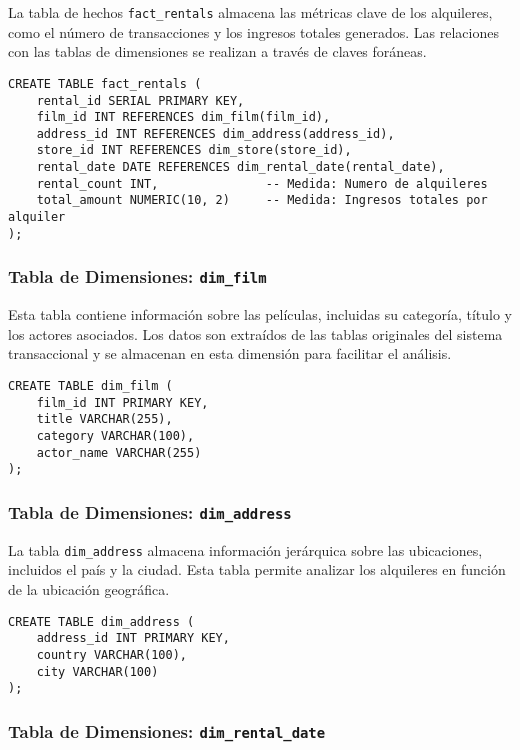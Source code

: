 \documentclass{article}
\begin{document}
La tabla de hechos \texttt{fact\_rentals} almacena las métricas clave de los alquileres, como el número de transacciones y los ingresos totales generados. Las relaciones con las tablas de dimensiones se realizan a través de claves foráneas.

\begin{lstlisting}
CREATE TABLE fact_rentals (
    rental_id SERIAL PRIMARY KEY,
    film_id INT REFERENCES dim_film(film_id),
    address_id INT REFERENCES dim_address(address_id),
    store_id INT REFERENCES dim_store(store_id),
    rental_date DATE REFERENCES dim_rental_date(rental_date),
    rental_count INT,               -- Medida: Numero de alquileres
    total_amount NUMERIC(10, 2)     -- Medida: Ingresos totales por alquiler
);
\end{lstlisting}

\subsubsection{Tabla de Dimensiones: \texttt{dim\_film}}

Esta tabla contiene información sobre las películas, incluidas su categoría, título y los actores asociados. Los datos son extraídos de las tablas originales del sistema transaccional y se almacenan en esta dimensión para facilitar el análisis.

\begin{lstlisting}
CREATE TABLE dim_film (
    film_id INT PRIMARY KEY,
    title VARCHAR(255),
    category VARCHAR(100),
    actor_name VARCHAR(255)
);
\end{lstlisting}

\subsubsection{Tabla de Dimensiones: \texttt{dim\_address}}

La tabla \texttt{dim\_address} almacena información jerárquica sobre las ubicaciones, incluidos el país y la ciudad. Esta tabla permite analizar los alquileres en función de la ubicación geográfica.

\begin{lstlisting}
CREATE TABLE dim_address (
    address_id INT PRIMARY KEY,
    country VARCHAR(100),
    city VARCHAR(100)
);
\end{lstlisting}

\subsubsection{Tabla de Dimensiones: \texttt{dim\_rental\_date}}
\end{document}
